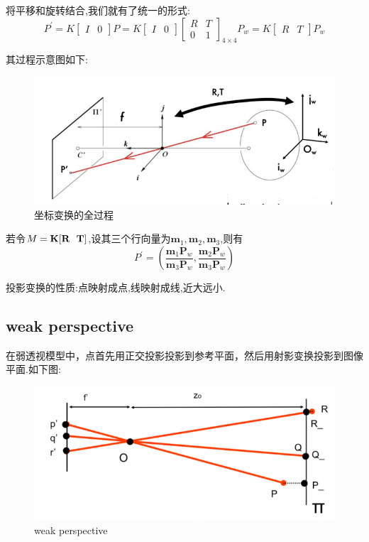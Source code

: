 将平移和旋转结合,我们就有了统一的形式:
\begin{equation}
	P^{\prime}=K\left[\begin{array}{ll}
		I & 0
	\end{array}\right] P=K\left[\begin{array}{ll}
		I & 0
	\end{array}\right]\left[\begin{array}{ll}
		R & T \\
		0 & 1
	\end{array}\right]_{4 \times 4} P_{w}=K\left[\begin{array}{ll}
		R & T
	\end{array}\right] P_{w}
\end{equation}

其过程示意图如下:
\begin{figure}[htbp]
	\centering
	\includegraphics[scale=0.75]{figures/transform_all.png}
	\caption{坐标变换的全过程}
	\label{}
\end{figure}

若令$M = \bold{K}[\bold{R} \ \ \bold{T}]$,设其三个行向量为$\bm m_1, \bm m_2, \bm m_3$,则有
\begin{equation}
	P^\prime = \left(\frac{\bm{m}_{1} \bm P_{w}}{\bm{m}_{3} \bm P_{w}}, \frac{\bm{m}_{2} \bm P_{w}}{\bm{m}_{3} \bm P_{w}}\right)
\end{equation}

投影变换的性质:点映射成点,线映射成线,近大远小.

\subsection{weak perspective}
在弱透视模型中，点首先用正交投影投影到参考平面，然后用射影变换投影到图像平面.如下图:
\begin{figure}[htbp]
	\centering
	\includegraphics[scale=0.8]{figures/weak_perspective.png}
	\caption{weak perspective}
	\label{}
\end{figure}

